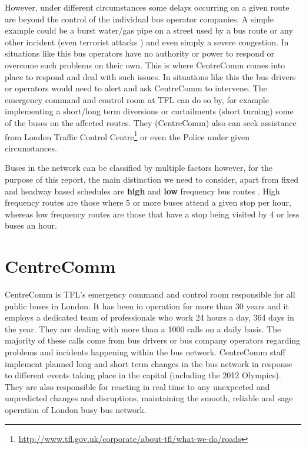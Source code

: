 However, under different circumstances some delays occurring on a given route are beyond the control of the individual bus operator companies. A simple example could be a burst water/gas pipe on a street used by a bus route or any other incident (even terrorist attacks \cite{centreComm}) and even simply a severe congestion. In situations like this bus operators have no authority or power to respond or overcome such problems on their own. This is where CentreComm comes into place to respond and deal with such issues. In situations like this the bus drivers or operators would need to alert and ask CentreComm to intervene. The emergency command and control room at TFL can do so by, for example implementing a short/long term diversions or curtailments (short turning) some of the buses on the affected routes. They (CentreComm) also can seek assistance from London Traffic Control Centre\footnote{\url{http://www.tfl.gov.uk/corporate/about-tfl/what-we-do/roads}} or even the Police under given circumstances.

Buses in the network can be classified by multiple factors however, for the purpose of this report, the main distinction we need to consider, apart from fixed and headway based schedules are \textbf{high} and \textbf{low} frequency bus routes \cite{busTendering}. High frequency routes are those where 5 or more buses attend a given stop per hour, whereas low frequency routes are those that have a stop being visited by 4 or less buses an hour.

\section{CentreComm}
CentreComm is TFL's emergency command and control room responsible for all public buses in London. It has been in operation for more than 30 years \cite{centreComm} and it employs a dedicated team of professionals who work 24 hours a day, 364 days in the year. They are dealing with more than a 1000 calls on a daily basis. The majority of these calls come from bus drivers or bus company operators regarding problems and incidents happening within the bus network. CentreComm staff implement planned long and short term changes in the bus network in response to different events taking place in the capital (including the 2012 Olympics). They are also responsible for reacting in real time to any unexpected and unpredicted changes and disruptions, maintaining the smooth, reliable and sage operation of London busy bus network.

